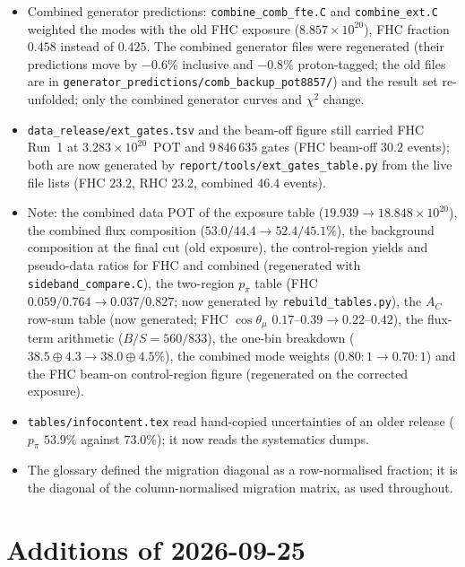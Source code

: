 \begin{itemize}\itemsep1pt
  \item Combined generator predictions: \texttt{combine\_comb\_fte.C} and \texttt{combine\_ext.C}
    weighted the modes with the old FHC exposure ($8.857\times10^{20}$), FHC fraction $0.458$ instead
    of $0.425$. The combined generator files were regenerated (their predictions move by $-0.6\%$
    inclusive and $-0.8\%$ proton-tagged; the old files are in
    \texttt{generator\_predictions/comb\_backup\_pot8857/}) and the result set re-unfolded; only the
    combined generator curves and $\chi^2$ change.
  \item \texttt{data\_release/ext\_gates.tsv} and the beam-off figure still carried FHC Run~1 at
    $3.283\times10^{20}$~POT and $9\,846\,635$ gates (FHC beam-off $30.2$ events); both are now
    generated by \texttt{report/tools/ext\_gates\_table.py} from the live file lists (FHC $23.2$, RHC
    $23.2$, combined $46.4$ events).
  \item Note: the combined data POT of the exposure table ($19.939\to18.848\times10^{20}$), the
    combined flux composition ($53.0/44.4\to52.4/45.1\%$), the background composition at the final cut
    (old exposure), the control-region yields and pseudo-data ratios for FHC and combined (regenerated
    with \texttt{sideband\_compare.C}), the two-region $p_\pi$ table (FHC $0.059/0.764\to0.037/0.827$;
    now generated by \texttt{rebuild\_tables.py}), the $A_C$ row-sum table (now generated; FHC
    $\cos\theta_\mu$ $0.17$--$0.39\to0.22$--$0.42$), the flux-term arithmetic ($B/S=560/833$), the
    one-bin breakdown ($38.5\oplus4.3\to38.0\oplus4.5\%$), the combined mode weights ($0.80{:}1\to0.70{:}1$)
    and the FHC beam-on control-region figure (regenerated on the corrected exposure).
  \item \texttt{tables/infocontent.tex} read hand-copied uncertainties of an older release
    ($p_\pi$ $53.9\%$ against $73.0\%$); it now reads the systematics dumps.
  \item The glossary defined the migration diagonal as a row-normalised fraction; it is the diagonal
    of the column-normalised migration matrix, as used throughout.
\end{itemize}

\section{Additions of 2026-09-25}

